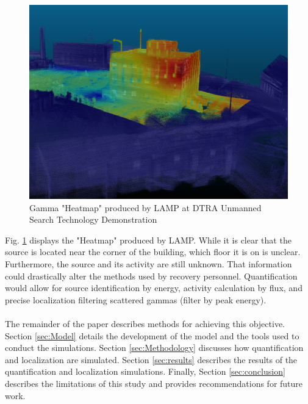 \begin{figure}[!htb]
  \centering
  \includegraphics[width=\columnwidth]{images/Heatmap}
  \caption{Gamma "Heatmap" produced by LAMP at DTRA Unmanned Search Technology Demonstration}
  \label{fig:Heatmap}
\end{figure}

Fig. \ref{fig:Heatmap} displays the "Heatmap" produced by LAMP. While it is clear that the source is located near the corner of the building, which floor it is on is unclear. Furthermore, the source and its activity are still unknown. That information could drastically alter the methods used by recovery personnel. Quantification would allow for source identification by energy, activity calculation by flux, and precise localization filtering scattered gammas (filter by peak energy).
\\\\
The remainder of the paper describes methods for achieving this objective. Section \ref{sec:Model} details the development of the model and the tools used to conduct the simulations.  Section \ref{sec:Methodology} discusses how quantification and localization are simulated. Section \ref{sec:results} describes the results of the quantification and localization simulations. Finally, Section \ref{sec:conclusion} describes the limitations of this study and provides recommendations for future work.

